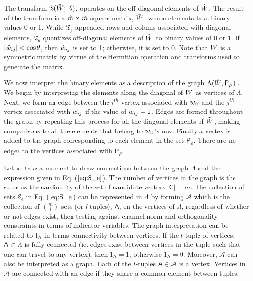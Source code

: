 The transform $\mathfrak{T}(\Hat{W};\ \theta)$, operates on the off-diagonal elements of $\Hat{W}$. The result of the transform is a $\Hat{m}\times\Hat{m}$ square matrix, $\Tilde{W}$, whose elements take binary values 0 or 1. While $\mathfrak{T}_\rho$ appended rows and colums associated with diagonal elements, $\mathfrak{T}_\theta$ quantizes off-diagonal elements of $\Hat{W}$ to binary values of 0 or 1. If $\vert \Hat{w}_{ij} \vert <\cos\theta$, then $\Hat{w}_{ij}$ is set to 1; otherwise, it is set to 0. Note that $\Tilde{W}$ is a symmetric matrix by virtue of the Hermitian operation and transforms used to generate the matrix.

We now interpret the binary elements as a description of the graph $\Lambda(\Tilde{W},\mathsf{P}_\rho$) . We begin by interpreting the elements along the diagonal of $\Tilde{W}$ as vertices of $\Lambda$. Next, we form an edge between the $i^{th}$ vertex associated with $\Tilde{w_{ii}}$ and the $j^{th}$ vertex associated with $\Tilde{w_{ij}}$ if the value of $\Tilde{w}_{ij}=1$. Edges are formed throughout the graph by repeating this process for all the diagonal elements of $\Tilde{W}$, making comparisons to all the elements that belong to $\Tilde{w}_{ii}$'s row. Finally a vertex is added to the graph corresponding to each element in the set $\mathsf{P}_\rho$. There are no edges to the vertices associated with $\mathsf{P}_\rho$.

Let us take a moment to draw connections between the graph $\Lambda$ and the expression given in Eq. ($\ref{eq:S_e}$). The number of vertices in the graph is the same as the cardinality of the set of candidate vectors $\vert \mathsf{C}\vert = m$. The collection of sets $\mathscr{S}_\epsilon$ in Eq. (\ref{eq:S_e}) can be represented in $\Lambda$ by forming $\mathscr{A}$ which is the collection of $\binom{m}{l}$ sets (or $l$-tuples), $\mathsf{A}$, on the vertices of $\Lambda$, regardless of whether or not edges exist, then testing against channel norm and orthogonality constraints in terms of indicator variables. The graph interpretation can be related to $1_{\mathsf{A}}$ in terms connectivity between vertices. If the $l$-tuple of vertices, $\mathsf{A}\subset\Lambda$ is fully connected (ie. edges exist between vertices in the tuple such that one can travel to any vertex), then   $1_{\mathsf{A}} = 1$, otherwise $1_{\mathsf{A}} = 0$. Moreover, $\mathscr{A}$ can also be interpreted as a graph. Each of the $l$-tuples $\mathsf{A}\in \mathscr{A}$ is a vertex. Vertices in $\mathscr{A}$ are connected with an edge if they share a common element between tuples.

